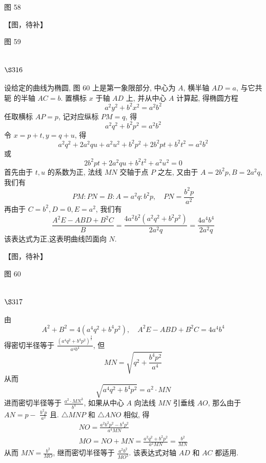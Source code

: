 图 58


【图，待补】

图 59

\section{$\S 316$}

设给定的曲线为椭圆, 图 60 上是第一象限部分, 中心为 $A$, 横半轴 $A D=a$, 与它共轭 的半轴 $A C=b$. 置横标 $x$ 于轴 $A D$ 上, 并从中心 $A$ 计算起, 得椭圆方程
\[
a^{2} y^{2}+b^{2} x^{2}=a^{2} b^{2}
\]
任取横标 $A P=p$, 记对应纵标 $P M=q$, 得
\[
a^{2} q^{2}+b^{2} p^{2}=a^{2} b^{2}
\]
令 $x=p+t, y=q+u$, 得
\[
a^{2} q^{2}+2 a^{2} q u+a^{2} u^{2}+b^{2} p^{2}+2 b^{2} p t+b^{2} t^{2}=a^{2} b^{2}
\]
或
\[
2 b^{2} p t+2 a^{2} q u+b^{2} t^{2}+a^{2} u^{2}=0
\]
首先由于 $t, u$ 的系数为正, 法线 $M N$ 交轴于点 $P$ 之左, 又由于 $A=2 b^{2} p, B=2 a^{2} q$, 我们有
\[
P M: P N=B: A=a^{2} q: b^{2} p, \quad P N=\frac{b^{2} p}{a^{2}}
\]
再由于 $C=b^{2}, D=0, E=a^{2}$, 我们有
\[
\frac{A^{2} E-A B D+B^{2} C}{B}=\frac{4 a^{2} b^{2}\left(a^{2} q^{2}+b^{2} p^{2}\right)}{2 a^{2} q}=\frac{4 a^{4} b^{4}}{2 a^{2} q}
\]
该表达式为正,这表明曲线凹面向 $N$.


【图，待补】

图 60

\section{$\S 317$}

由
\[
A^{2}+B^{2}=4\left(a^{4} q^{2}+b^{4} p^{2}\right), \quad A^{2} E-A B D+B^{2} C=4 a^{4} b^{4}
\]
得密切半径等于 $\frac{\left(a^{4} q^{2}+b^{4} p^{2}\right)^{\frac{3}{2}}}{a^{4} b^{4}}$, 但
\[
M N=\sqrt{q^{2}+\frac{b^{4} p^{2}}{a^{4}}}
\]
从而
\[
\sqrt{a^{4} q^{2}+b^{4} p^{2}}=a^{2} \cdot M N
\]
进而密切半径等于 $\frac{a^{2} \cdot M N^{3}}{b^{4}}$, 如果从中心 $A$ 向法线 $M N$ 引垂线 $A O$, 那么由于 $A N=p-$ $\frac{b^{2} p}{a^{2}}$ 且. $\triangle M N P$ 和 $\triangle A N O$ 相似, 得
\[
\begin{gathered}
N O=\frac{a^{2} b^{2} p^{2}-b^{4} p^{2}}{a^{4} M N} \\
M O=N O+M N=\frac{a^{2} q^{2}+b^{2} p^{2}}{a^{2} M N}=\frac{b^{2}}{M N}
\end{gathered}
\]
从而 $M N=\frac{b^{2}}{M O}$, 继而密切半径等于 $\frac{a^{2} b^{2}}{M O^{3}}$. 该表达式对轴 $A D$ 和 $A C$ 都适用.

